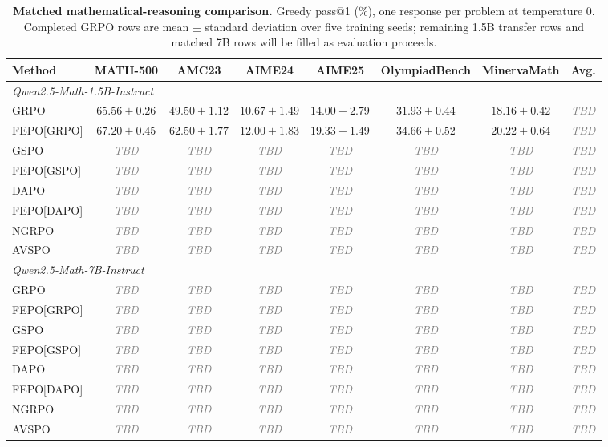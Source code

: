 \documentclass{article}
\newcommand{\TBD}{\textcolor{gray}{\textit{TBD}}}
\newcommand{\FEPO}{\textsc{FEPO}\xspace}
\begin{document}
\begin{table}[H]
\centering
\scriptsize
\setlength{\tabcolsep}{2.2pt}
\renewcommand{\arraystretch}{1.08}
\begin{tabular*}{\linewidth}{@{\extracolsep{\fill}}lccccccc@{}}
\toprule
Method & MATH-500 & AMC23 & AIME24 & AIME25 & OlympiadBench & MinervaMath & Avg.\\
\midrule
\multicolumn{8}{l}{\textit{Qwen2.5-Math-1.5B-Instruct}}\\
GRPO & $65.56\pm0.26$ & $49.50\pm1.12$ & $10.67\pm1.49$ & $14.00\pm2.79$ & $31.93\pm0.44$ & $18.16\pm0.42$ & \TBD\\
\FEPO[GRPO] & $\mathbf{67.20\pm0.45}$ & $\mathbf{62.50\pm1.77}$ & $\mathbf{12.00\pm1.83}$ & $\mathbf{19.33\pm1.49}$ & $\mathbf{34.66\pm0.52}$ & $\mathbf{20.22\pm0.64}$ & \TBD\\
GSPO & \TBD & \TBD & \TBD & \TBD & \TBD & \TBD & \TBD\\
\FEPO[GSPO] & \TBD & \TBD & \TBD & \TBD & \TBD & \TBD & \TBD\\
DAPO & \TBD & \TBD & \TBD & \TBD & \TBD & \TBD & \TBD\\
\FEPO[DAPO] & \TBD & \TBD & \TBD & \TBD & \TBD & \TBD & \TBD\\
NGRPO & \TBD & \TBD & \TBD & \TBD & \TBD & \TBD & \TBD\\
AVSPO & \TBD & \TBD & \TBD & \TBD & \TBD & \TBD & \TBD\\
\midrule
\multicolumn{8}{l}{\textit{Qwen2.5-Math-7B-Instruct}}\\
GRPO & \TBD & \TBD & \TBD & \TBD & \TBD & \TBD & \TBD\\
\FEPO[GRPO] & \TBD & \TBD & \TBD & \TBD & \TBD & \TBD & \TBD\\
GSPO & \TBD & \TBD & \TBD & \TBD & \TBD & \TBD & \TBD\\
\FEPO[GSPO] & \TBD & \TBD & \TBD & \TBD & \TBD & \TBD & \TBD\\
DAPO & \TBD & \TBD & \TBD & \TBD & \TBD & \TBD & \TBD\\
\FEPO[DAPO] & \TBD & \TBD & \TBD & \TBD & \TBD & \TBD & \TBD\\
NGRPO & \TBD & \TBD & \TBD & \TBD & \TBD & \TBD & \TBD\\
AVSPO & \TBD & \TBD & \TBD & \TBD & \TBD & \TBD & \TBD\\
\bottomrule
\end{tabular*}
\caption{\textbf{Matched mathematical-reasoning comparison.} Greedy pass@1 (\%), one response per problem at temperature $0$. Completed GRPO rows are mean $\pm$ standard deviation over five training seeds; remaining 1.5B transfer rows and matched 7B rows will be filled as evaluation proceeds.}
\label{tab:main_compact}
\end{table}
\end{document}
